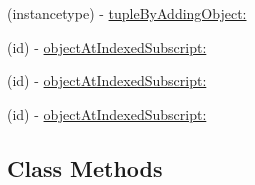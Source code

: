 \begin{DoxyCompactItemize}
(instancetype) -\/ \mbox{\hyperlink{interface_r_a_c_tuple_a9ad29985f13aa286f5923ca4c98d30a5}{tuple\+By\+Adding\+Object\+:}}
\item 
(id) -\/ \mbox{\hyperlink{interface_r_a_c_tuple_ad2360332f752318fc924727c17eb67c9}{object\+At\+Indexed\+Subscript\+:}}
\item 
(id) -\/ \mbox{\hyperlink{interface_r_a_c_tuple_ad2360332f752318fc924727c17eb67c9}{object\+At\+Indexed\+Subscript\+:}}
\item 
(id) -\/ \mbox{\hyperlink{interface_r_a_c_tuple_ad2360332f752318fc924727c17eb67c9}{object\+At\+Indexed\+Subscript\+:}}
\end{DoxyCompactItemize}
\subsection*{Class Methods}
